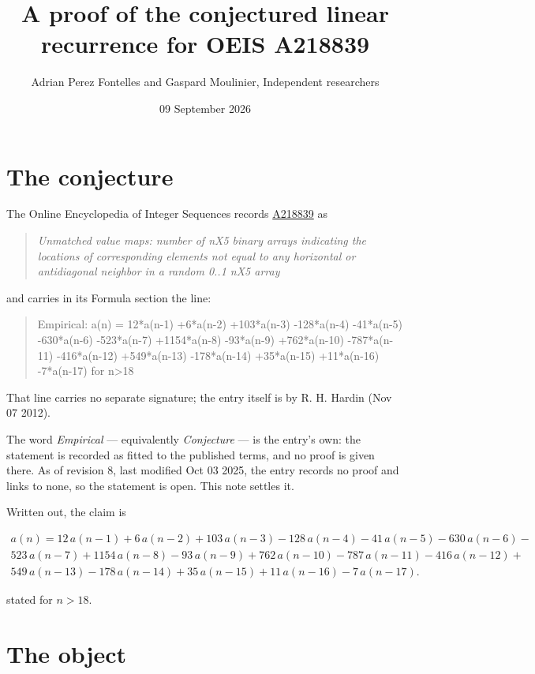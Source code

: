 \documentclass[11pt]{article}
\title{A proof of the conjectured linear recurrence for OEIS A218839}
\author{Adrian Perez Fontelles and Gaspard Moulinier, Independent researchers}
\date{09 September 2026}
\theoremstyle{definition}
\begin{document}
\maketitle
\section{The conjecture}

The Online Encyclopedia of Integer Sequences records \href{https://oeis.org/A218839}{A218839} as

\begin{quote}\itshape Unmatched value maps: number of nX5 binary arrays indicating the locations of corresponding elements not equal to any horizontal or antidiagonal neighbor in a random 0..1 nX5 array\end{quote}

and carries in its Formula section the line:

\begin{quote}\ttfamily Empirical: a(n) = 12*a(n-1) +6*a(n-2) +103*a(n-3) -128*a(n-4) -41*a(n-5) -630*a(n-6) -523*a(n-7) +1154*a(n-8) -93*a(n-9) +762*a(n-10) -787*a(n-11) -416*a(n-12) +549*a(n-13) -178*a(n-14) +35*a(n-15) +11*a(n-16) -7*a(n-17) for n>18\end{quote}

That line carries no separate signature; the entry itself is by R. H. Hardin (Nov 07 2012).

The word {\itshape Empirical} --- equivalently {\itshape Conjecture} --- is the entry's own: the statement is recorded as fitted to the published terms, and no proof is given there. As of revision 8, last modified Oct 03 2025, the entry records no proof and links to none, so the statement is open. This note settles it.

Written out, the claim is

\begin{multline*} a(n) = 12\,a(n-1) + 6\,a(n-2) + 103\,a(n-3) - 128\,a(n-4) - 41\,a(n-5) - 630\,a(n-6) - \\ 523\,a(n-7) + 1154\,a(n-8) - 93\,a(n-9) + 762\,a(n-10) - 787\,a(n-11) - 416\,a(n-12) + \\ 549\,a(n-13) - 178\,a(n-14) + 35\,a(n-15) + 11\,a(n-16) - 7\,a(n-17). \end{multline*}

stated for $n > 18$.

\section{The object}
\end{document}
